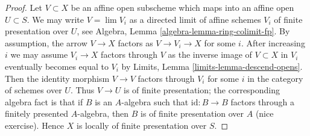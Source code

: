 \documentclass[10pt,a4paper]{amsart}
\theoremstyle{plain}
\theoremstyle{definition}
\theoremstyle{remark}
\numberwithin{equation}{subsection}
\def\lim{\mathop{\mathrm{lim}}\nolimits}
\begin{document}
\begin{proof}
Let $V \subset X$ be an affine open subscheme which maps into an affine
open $U \subset S$. We may write $V = \lim V_i$ as a directed limit of affine
schemes $V_i$ of finite presentation over $U$, see
Algebra, Lemma \ref{algebra-lemma-ring-colimit-fp}.
By assumption, the arrow $V \to X$ factors as $V \to V_i \to X$
for some $i$. After increasing $i$ we may assume $V_i \to X$
factors through $V$ as the inverse image of $V \subset X$ in $V_i$
eventually becomes equal to $V_i$ by
Limits, Lemma \ref{limits-lemma-descend-opens}.
Then the identity morphism $V \to V$ factors through $V_i$ for some $i$
in the category of schemes over $U$. Thus $V \to U$ is of finite presentation;
the corresponding algebra fact is that if $B$ is an $A$-algebra
such that $\text{id} : B \to B$ factors through a finitely presented
$A$-algebra, then $B$ is of finite presentation over $A$ (nice exercise).
Hence $X$ is locally of finite presentation over $S$.
\end{proof}
\end{document}
